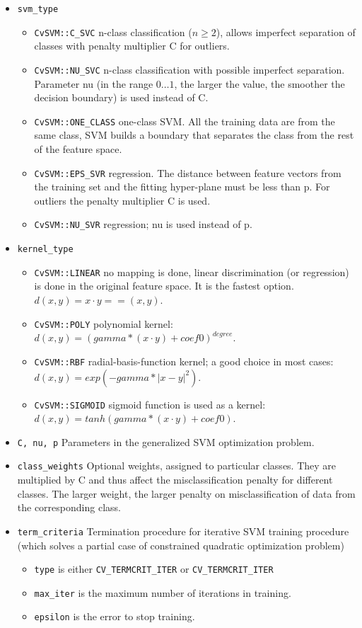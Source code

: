 \begin{itemize}
 \item \lstinline|svm_type|
 \begin{itemize}
  \item \lstinline|CvSVM::C_SVC| n-class classification ($n \geq 2$), allows imperfect separation of classes with penalty multiplier C for outliers.
  \item \lstinline|CvSVM::NU_SVC| n-class classification with possible imperfect separation. Parameter nu (in the range $0\ldots1$, the larger the value, the smoother the decision boundary) is used instead of C.
  \item \lstinline|CvSVM::ONE_CLASS| one-class SVM. All the training data are from the same class, SVM builds a boundary that separates the class from the rest of the feature space.
  \item \lstinline|CvSVM::EPS_SVR| regression. The distance between feature vectors from the training set and the fitting hyper-plane must be less than p. For outliers the penalty multiplier C is used.
  \item \lstinline|CvSVM::NU_SVR| regression; nu is used instead of p. 
 \end{itemize}
\item \lstinline|kernel_type|
\begin{itemize}
 \item \lstinline|CvSVM::LINEAR| no mapping is done, linear discrimination (or regression) is done in the original feature space. It is the fastest option. $d(x,y) = x \cdot y == (x,y)$.
 \item \lstinline|CvSVM::POLY| polynomial kernel: $d(x,y) = (gamma * (x \cdot y) + coef0)^{degree}$.
 \item \lstinline|CvSVM::RBF| radial-basis-function kernel; a good choice in most cases: $d(x,y) = exp(-gamma*|x-y|^2)$.
 \item \lstinline|CvSVM::SIGMOID| sigmoid function is used as a kernel: $d(x,y) = tanh(gamma * (x \cdot y) + coef0)$.
\end{itemize}
 \item \lstinline|C, nu, p| Parameters in the generalized SVM optimization problem. 
\item \lstinline|class_weights| Optional weights, assigned to particular classes. They are multiplied by C and thus affect the misclassification penalty for different classes. The larger weight, the larger penalty on misclassification of data from the corresponding class.
\item \lstinline|term_criteria| Termination procedure for iterative SVM training procedure (which solves a partial case of constrained quadratic optimization problem)
 \begin{itemize}
  \item \lstinline|type| is either \lstinline|CV_TERMCRIT_ITER| or \lstinline|CV_TERMCRIT_ITER| 
  \item \lstinline|max_iter| is the maximum number of iterations in training.
  \item \lstinline|epsilon| is the error to stop training.
 \end{itemize}
\end{itemize}

